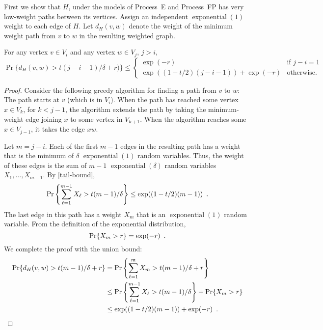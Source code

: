 \documentclass[lotsofwhite]{patmorin}
\DeclareMathOperator{\exponential}{exponential}
\begin{document}
First we show that $H$, under the models of Process~E and Process~FP
has very low-weight paths between its vertices.
Assign an independent $\exponential(1)$ weight to each edge of $H$.
Let $d_H(v,w)$ denote the weight of the minimum weight path from $v$
to $w$ in the resulting weighted graph.

\begin{lem}
   For any vertex $v\in V_i$ and any vertex $w\in V_j$, $j>i$,
   \[
       \Pr\{d_H(v,w) > t(j-i-1)/\delta + r) \} \le
       \begin{cases}
           \exp(-r) & \text{if $j-i=1$} \\
           \exp((1-t/2)(j-i-1)) + \exp(-r) & \text{otherwise.}
       \end{cases}
   \]
\end{lem}

\begin{proof}
   Consider the following greedy algorithm for finding a path from $v$
   to $w$: The path starts at $v$ (which is in $V_i$).  When the path
   has reached some vertex $x\in V_{k}$, for $k<j-1$, the algorithm
   extends the path by taking the minimum-weight edge joining $x$ to some
   vertex in $V_{k+1}$.  When the algorithm reaches some $x\in V_{j-1}$,
   it takes the edge $xw$.

   Let $m=j-i$.  Each of the first $m-1$ edges in the resulting path
   has a weight that is the minimum of $\delta$ $\exponential(1)$
   random variables.  Thus, the weight of these edges is the sum of
   $m-1$ $\exponential(\delta)$ random variables $X_1,\ldots,X_{m-1}$.
   By \eqref{tail-bound},
   \begin{equation}
     \Pr\left\{\sum_{\ell=1}^{m-1} X_\ell > t(m-1)/\delta \right\} \le 
        \exp((1-t/2)(m-1)) \enspace .  \eqlabel{part-i}
   \end{equation}
   The last edge in this path has a weight $X_m$ that is an
   $\exponential(1)$ random variable.  From the definition
   of the exponential distribution,
   \begin{equation}
      \Pr\{X_m > r\} = \exp(-r) \enspace . \eqlabel{part-ii}
   \end{equation}
   We complete the proof with the union bound:
   \begin{align*}
      \Pr\{d_H(v,w) > t(m-1)/\delta + r\} &
        = \Pr\left\{\sum_{\ell=1}^m X_m > t(m-1)/\delta + r\right\} \\
        & \le \Pr\left\{\sum_{\ell=1}^{m-1} X_\ell > t(m-1)/\delta\right\}
          + \Pr\{X_m>r\} \\
        & \le \exp((1-t/2)(m-1)) + \exp(-r) \enspace . \qedhere
   \end{align*}
\end{proof}
\end{document}
